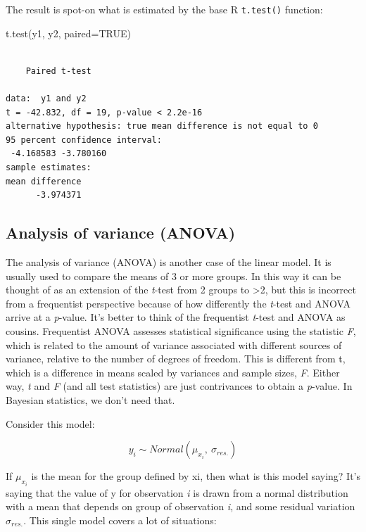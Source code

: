 \documentclass[
  13,
  letterpaper,
]{report}
\newenvironment{Shaded}{\begin{snugshade}}{\end{snugshade}}
\newcommand{\AttributeTok}[1]{\textcolor[rgb]{0.40,0.45,0.13}{#1}}
\newcommand{\ConstantTok}[1]{\textcolor[rgb]{0.56,0.35,0.01}{#1}}
\newcommand{\FunctionTok}[1]{\textcolor[rgb]{0.28,0.35,0.67}{#1}}
\newcommand{\NormalTok}[1]{\textcolor[rgb]{0.00,0.23,0.31}{#1}}
\begin{document}
The result is spot-on what is estimated by the base R \texttt{t.test()}
function:

\begin{Shaded}
\begin{Highlighting}[]
\FunctionTok{t.test}\NormalTok{(y1, y2, }\AttributeTok{paired=}\ConstantTok{TRUE}\NormalTok{)}
\end{Highlighting}
\end{Shaded}

\begin{verbatim}

    Paired t-test

data:  y1 and y2
t = -42.832, df = 19, p-value < 2.2e-16
alternative hypothesis: true mean difference is not equal to 0
95 percent confidence interval:
 -4.168583 -3.780160
sample estimates:
mean difference 
      -3.974371 
\end{verbatim}

\subsection{Analysis of variance (ANOVA)}\label{sec-linear-groups-anova}

The analysis of variance (ANOVA) is another case of the linear model. It
is usually used to compare the means of 3 or more groups. In this way it
can be thought of as an extension of the \emph{t}-test from 2 groups to
\textgreater2, but this is incorrect from a frequentist perspective
because of how differently the \emph{t}-test and ANOVA arrive at a
\emph{p}-value. It's better to think of the frequentist \emph{t}-test
and ANOVA as cousins. Frequentist ANOVA assesses statistical
significance using the statistic \emph{F}, which is related to the
amount of variance associated with different sources of variance,
relative to the number of degrees of freedom. This is different from t,
which is a difference in means scaled by variances and sample sizes,
\emph{F}. Either way, \emph{t} and \emph{F} (and all test statistics)
are just contrivances to obtain a \emph{p}-value. In Bayesian
statistics, we don't need that.

Consider this model:

\[y_i\sim Normal\left(\mu_{x_i},\ \sigma_{res.}\right)\]

If \(\mu_{x_i}\) is the mean for the group defined by xi, then what is
this model saying? It's saying that the value of y for observation
\emph{i} is drawn from a normal distribution with a mean that depends on
group of observation \emph{i}, and some residual variation
\(\sigma_{res.}\). This single model covers a lot of situations:
\end{document}
